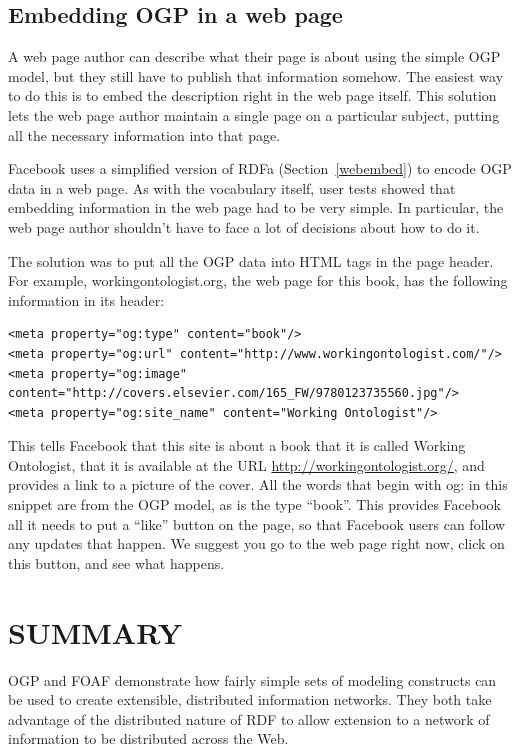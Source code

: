 \subsection{Embedding OGP in a web page}

A web page author can describe what their page is about using the simple
OGP model, but they still have to publish that information somehow. The
easiest way to do this is to embed the description right in the web page
itself. This solution lets the web page author maintain a single page on
a particular subject, putting all the necessary information into that
page.

Facebook uses a simplified version of RDFa (Section~\ref{webembed}) to 
encode OGP data in a web
page. As with the vocabulary itself, user tests showed that embedding
information in the web page had to be very simple. In particular, the
web page author shouldn't have to face a lot of decisions about how to
do it.

The solution was to put all the OGP data into HTML tags in the page
header. For example, workingontologist.org, the web page for this book,
has the following information in its header:

\begin{lstlisting}
<meta property="og:type" content="book"/>
<meta property="og:url" content="http://www.workingontologist.com/"/>
<meta property="og:image" content="http://covers.elsevier.com/165_FW/9780123735560.jpg"/>
<meta property="og:site_name" content="Working Ontologist"/>
\end{lstlisting}


This tells Facebook that this site is about a book that it is called
Working Ontologist, that it is available at the URL
\href{http://workingontologist.org/}{http://workingontologist.org/,} and
provides a link to a picture of the cover. All the words that begin with
og: in this snippet are from the OGP model, as is the type ``book''.
This provides Facebook all it needs to put a ``like'' button on the
page, so that Facebook users can follow any updates that happen. We
suggest you go to the web page right now, click on this button, and see
what happens.

\section{SUMMARY}

OGP and FOAF demonstrate how fairly simple sets of modeling constructs
can be used to create extensible, distributed information networks. They
both take advantage of the distributed nature of RDF to allow extension
to a network of information to be distributed across the Web.

